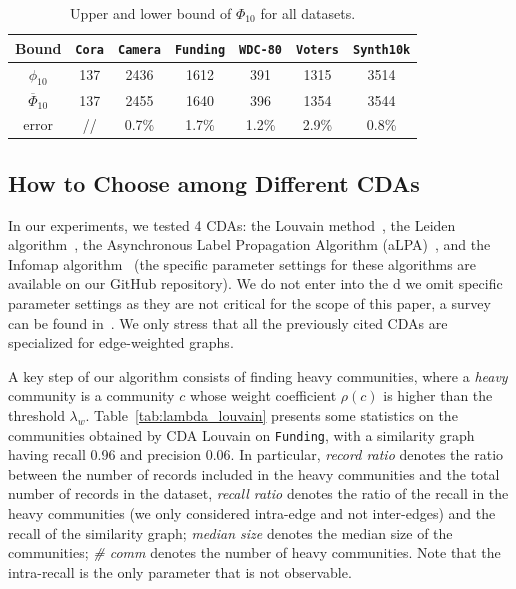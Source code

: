 \documentclass[sigconf, nonacm]{acmart}
\newcommand{\cora}{\texttt{Cora}\xspace}
\newcommand{\camera}{\texttt{Camera}\xspace}
\newcommand{\funding}{\texttt{Funding}\xspace}
\newcommand{\voters}{\texttt{Voters}\xspace}
\newcommand{\wdc}{\texttt{WDC-80}\xspace}
\newcommand{\synth}{\texttt{Synth10k}\xspace}
\begin{document}
{\small
\begin{table}[h!]
\centering
\begin{tabular}{c c c c c c c }
\hline
Bound & \cora & \camera & \funding & \wdc &\voters & \synth\\
\hline
$\phi_{10}$          & 137  & 2436  & 1612 & 391 & 1315 & 3514 \\
$\overline\Phi_{10}$ & 137  & 2455  & 1640 & 396 & 1354 & 3544 \\
\hline
\hline
error & // & 0.7\% & 1.7\% & 1.2\% & 2.9\% & 0.8\%\\
\hline
\end{tabular}
\caption{Upper and lower bound of $\Phi_{10}$ for all datasets.}
\label{tab:upper_lower_bound}
\end{table}
}





\subsection{How to Choose among Different CDAs}\label{sub:communities_experiments}

In our experiments, we tested 4 CDAs: the Louvain method~\cite{louvain}, the Leiden algorithm~\cite{leiden}, the Asynchronous Label Propagation Algorithm (aLPA)~\cite{lpa}, and the Infomap algorithm~\cite{infomap} (the specific parameter settings for these algorithms are available on our GitHub repository). We do not enter into the d we omit specific parameter settings as they are not critical for the scope of this paper, 
a survey can be found in~\cite{survey_cda}. We only stress that all the previously cited CDAs are specialized for edge-weighted graphs.

A key step of our algorithm consists of finding heavy communities, where a \emph{heavy} community is a community $c$ whose weight coefficient $\rho(c)$ is higher than the threshold $\lambda_w$. Table~\ref{tab:lambda_louvain} presents some statistics on the communities obtained by CDA Louvain on \funding, with a similarity graph having recall 0.96 and precision 0.06. In particular, \emph{record ratio} denotes the ratio between the number of records included in the heavy communities and the total number of records in the dataset, \emph{recall ratio} denotes the ratio of the recall in the heavy communities (we only considered intra-edge and not inter-edges) and the recall of the similarity graph; \emph{median size} denotes the median size of the communities; \emph{\# comm} denotes the number of heavy communities. Note that the intra-recall is the only parameter that is not observable.
\end{document}
